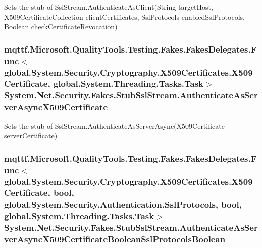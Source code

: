 Sets the stub of Ssl\-Stream.\-Authenticate\-As\-Client(\-String target\-Host, X509\-Certificate\-Collection client\-Certificates, Ssl\-Protocols enabled\-Ssl\-Protocols, Boolean check\-Certificate\-Revocation)

\hypertarget{class_system_1_1_net_1_1_security_1_1_fakes_1_1_stub_ssl_stream_a3856c1c3262d242418ce5dfbe2dc477d}{
\subsubsection[{Authenticate\-As\-Server\-Async\-X509\-Certificate}]{\setlength{\rightskip}{0pt plus 5cm}mqttf.\-Microsoft.\-Quality\-Tools.\-Testing.\-Fakes.\-Fakes\-Delegates.\-Func$<$global.\-System.\-Security.\-Cryptography.\-X509\-Certificates.\-X509\-Certificate, global.\-System.\-Threading.\-Tasks.\-Task$>$ System.\-Net.\-Security.\-Fakes.\-Stub\-Ssl\-Stream.\-Authenticate\-As\-Server\-Async\-X509\-Certificate}}\label{class_system_1_1_net_1_1_security_1_1_fakes_1_1_stub_ssl_stream_a3856c1c3262d242418ce5dfbe2dc477d}


Sets the stub of Ssl\-Stream.\-Authenticate\-As\-Server\-Async(\-X509\-Certificate server\-Certificate)

\hypertarget{class_system_1_1_net_1_1_security_1_1_fakes_1_1_stub_ssl_stream_a6567d32116005f9e1afaf07c2e1388c7}{
\subsubsection[{Authenticate\-As\-Server\-Async\-X509\-Certificate\-Boolean\-Ssl\-Protocols\-Boolean}]{\setlength{\rightskip}{0pt plus 5cm}mqttf.\-Microsoft.\-Quality\-Tools.\-Testing.\-Fakes.\-Fakes\-Delegates.\-Func$<$global.\-System.\-Security.\-Cryptography.\-X509\-Certificates.\-X509\-Certificate, bool, global.\-System.\-Security.\-Authentication.\-Ssl\-Protocols, bool, global.\-System.\-Threading.\-Tasks.\-Task$>$ System.\-Net.\-Security.\-Fakes.\-Stub\-Ssl\-Stream.\-Authenticate\-As\-Server\-Async\-X509\-Certificate\-Boolean\-Ssl\-Protocols\-Boolean}}\label{class_system_1_1_net_1_1_security_1_1_fakes_1_1_stub_ssl_stream_a6567d32116005f9e1afaf07c2e1388c7}


